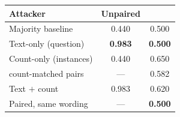 \setlength{\tabcolsep}{4pt}
\begin{tabular}{lcc}
\toprule
Attacker & Unpaired & \bench{} \\
\midrule
Majority baseline & 0.440 & 0.500 \\
Text-only (question) & \textbf{0.983} & \textbf{0.500} \\
Count-only (instances) & 0.440 & 0.650 \\
\quad count-matched pairs & --- & 0.582 \\
Text $+$ count & 0.983 & 0.620 \\
Paired, same wording & --- & \textbf{0.500} \\
\bottomrule
\end{tabular}
